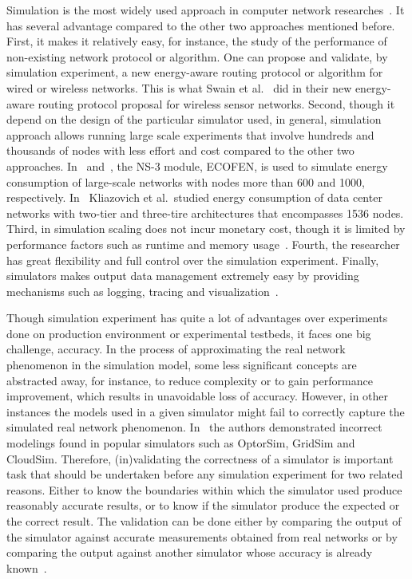 Simulation is the most widely used approach in computer network researches~\cite{DBLP:conf/icc/WeingartnerLW09}. It has several advantage compared to the other two approaches mentioned before. First, it makes it relatively easy, for instance, the study of the performance of non-existing network protocol or algorithm. One can propose and validate, by simulation experiment, a new energy-aware routing protocol or algorithm for wired or wireless networks. This is what Swain et al.~\cite{DBLP:conf/aina/SwainHC10} did in their new energy-aware routing protocol proposal for wireless sensor networks. Second, though it depend on the design of the particular simulator used, in general, simulation approach allows running large scale experiments that involve hundreds and thousands of nodes with less effort and cost compared to the other two approaches. In~\cite{DBLP:conf/wowmom/OrgerieLLL11} and~\cite{DBLP:conf/cloudnet/CorneaOL14}, the NS-3 module, ECOFEN, is used to simulate energy consumption of large-scale networks with nodes more than 600 and 1000, respectively. In~\cite{DBLP:journals/tjs/KliazovichBK12} Kliazovich et al.~studied energy consumption of data center networks with two-tier and three-tire architectures that encompasses 1536 nodes. Third, in simulation scaling does not incur monetary cost, though it is limited by performance factors such as runtime and memory usage~\cite{DBLP:conf/icc/WeingartnerLW09}. Fourth, the researcher has great flexibility and full control over the simulation experiment. Finally, simulators makes output data management extremely easy by providing mechanisms such as logging, tracing and visualization~\cite{ns3,DBLP:journals/jpdc/CasanovaGLQS14}.  

Though simulation experiment has quite a lot of advantages over experiments done on production environment or experimental testbeds, it faces one big challenge, accuracy. In the process of approximating the real network phenomenon in the simulation model, some less significant concepts are abstracted away, for instance, to reduce complexity or to gain performance improvement, which results in unavoidable loss of accuracy. However, in other instances the models used in a given simulator might fail to correctly capture the simulated real network phenomenon. In~\cite{DBLP:journals/tomacs/VelhoSCL13} the authors demonstrated incorrect modelings found in popular simulators such as OptorSim, GridSim and CloudSim. Therefore, (in)validating the correctness of a simulator is important task that should be undertaken before any simulation experiment for two related reasons. Either to know the boundaries within which the simulator used produce reasonably accurate results, or to know if the simulator produce the expected or the correct result. The validation can be done either by comparing the output of the simulator against accurate measurements obtained from real networks or by comparing the output against another simulator whose accuracy is already known~\cite{DBLP:books/daglib/0076234}.


